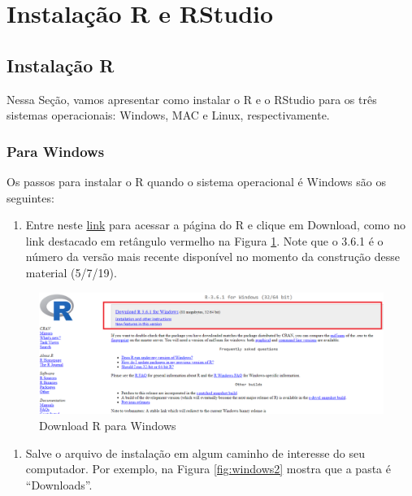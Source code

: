 \documentclass[
]{book}
\providecommand{\tightlist}{%
  \setlength{\itemsep}{0pt}\setlength{\parskip}{0pt}}
\begin{document}
\hypertarget{instalauxe7uxe3o-r-e-rstudio}{%
\section{Instalação R e RStudio}\label{instalauxe7uxe3o-r-e-rstudio}}

\hypertarget{instalauxe7uxe3o-r}{%
\subsection{Instalação R}\label{instalauxe7uxe3o-r}}

Nessa Seção, vamos apresentar como instalar o R e o RStudio para os três sistemas operacionais: Windows, MAC e Linux, respectivamente.

\hypertarget{para-windows}{%
\subsubsection{Para Windows}\label{para-windows}}

Os passos para instalar o R quando o sistema operacional é Windows são os seguintes:

\begin{enumerate}
\def\labelenumi{\arabic{enumi})}
\tightlist
\item
  Entre neste \href{https://cran.r-project.org/bin/windows/base/}{link} para acessar a página do R e clique em Download, como no link destacado em retângulo vermelho na Figura \ref{fig:windows1}. Note que o 3.6.1 é o número da versão mais recente disponível no momento da construção desse material (5/7/19).
\end{enumerate}

\begin{figure}
\includegraphics[width=1\linewidth]{figures/install_Windows} \caption{Download R para Windows}\label{fig:windows1}
\end{figure}

\begin{enumerate}
\def\labelenumi{\arabic{enumi})}
\setcounter{enumi}{1}
\tightlist
\item
  Salve o arquivo de instalação em algum caminho de interesse do seu computador. Por exemplo, na Figura \ref{fig:windows2} mostra que a pasta é ``Downloads''.
\end{enumerate}
\end{document}
